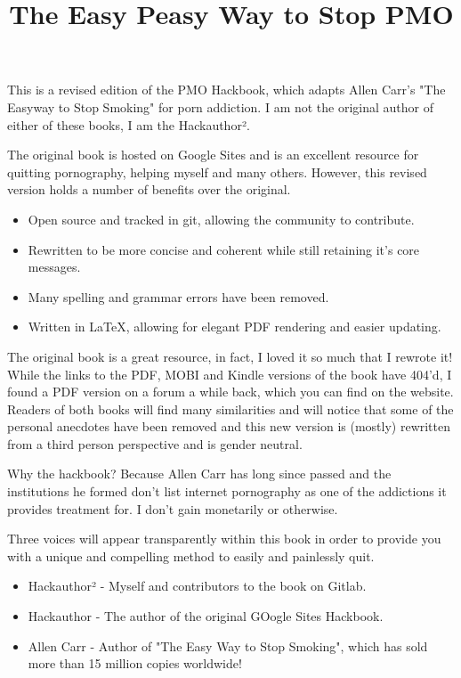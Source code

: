 \documentclass[easypeasy.tex]{subfiles}
\title{The Easy Peasy Way to Stop PMO}
\begin{document}
\maketitle

This is a revised edition of the PMO Hackbook, which adapts Allen Carr's "The Easyway to Stop Smoking" for porn addiction. I am not the original author of either of these books, I am the Hackauthor².

The original book is hosted on Google Sites and is an excellent resource for quitting pornography, helping myself and many others. However, this revised version holds a number of benefits over the original.
\begin{itemize}
\item Open source and tracked in git, allowing the community to contribute.
\item Rewritten to be more concise and coherent while still retaining it's core messages.
\item Many spelling and grammar errors have been removed.
\item Written in LaTeX, allowing for elegant PDF rendering and easier updating.
\end{itemize}

The original book is a great resource, in fact, I loved it so much that I rewrote it! While the links to the PDF, MOBI and Kindle versions of the book have 404'd, I found a PDF version on a forum a while back, which you can find on the website. Readers of both books will find many similarities and will notice that some of the personal anecdotes have been removed and this new version is (mostly) rewritten from a third person perspective and is gender neutral.

Why the hackbook? Because Allen Carr has long since passed and the institutions he formed don't list internet pornography as one of the addictions it provides treatment for. I don't gain monetarily or otherwise. 

Three voices will appear transparently within this book in order to provide you with a unique and compelling method to easily and painlessly quit.
\begin{itemize}
  \item Hackauthor² - Myself and contributors to the book on Gitlab.
  \item Hackauthor - The author of the original GOogle Sites Hackbook.
  \item Allen Carr - Author of "The Easy Way to Stop Smoking", which has sold more than 15 million copies worldwide!
\end{itemize}
\end{document}
